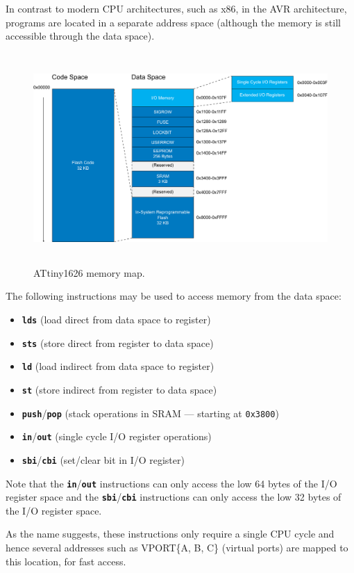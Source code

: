 \documentclass{report}
\newcommand{\keywordinline}[1]{\textcolor[rgb]{0.00,0.50,0.00}{\textbf{\texttt{#1}}}}
\begin{document}
In contrast to modern CPU architectures, such as x86, in the AVR architecture,
programs are located in a separate address space (although the memory is still accessible through the data space).
\begin{figure}[H]
    \centering
    \includegraphics[height = 8cm, keepaspectratio = true]{figures/memory_map.pdf}
    \caption{ATtiny1626 memory map.} %
\end{figure}
The following instructions may be used to access memory from the data space:
\begin{itemize}
    \item \keywordinline{lds} (load direct from data space to register)
    \item \keywordinline{sts} (store direct from register to data space)
    \item \keywordinline{ld} (load indirect from data space to register)
    \item \keywordinline{st} (store indirect from register to data space)
    \item \keywordinline{push}/\keywordinline{pop} (stack operations in SRAM --- starting at \texttt{0x3800}) %
    \item \keywordinline{in}/\keywordinline{out} (single cycle I/O register operations)
    \item \keywordinline{sbi}/\keywordinline{cbi} (set/clear bit in I/O register)
\end{itemize}
Note that the \keywordinline{in}/\keywordinline{out} instructions can
only access the low 64 bytes of the I/O register space and the \keywordinline{sbi}/\keywordinline{cbi}
instructions can only access the low 32 bytes of the I/O register space.

As the name suggests, these instructions only require a single CPU cycle and hence
several addresses such as VPORT\{A, B, C\} (virtual ports) are mapped to this location,
for fast access.
\end{document}

